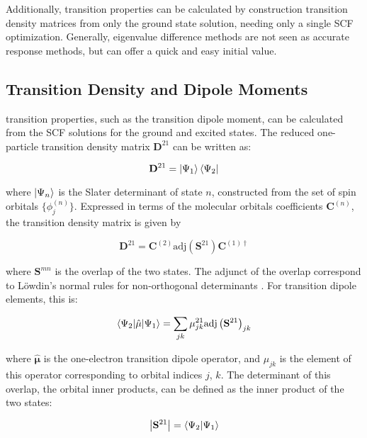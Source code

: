 Additionally, transition properties can be calculated by construction transition 
density matrices from only the ground state solution, needing only a single SCF optimization. 
Generally, eigenvalue difference methods are not seen as accurate response methods,
but can offer a quick and easy initial value\cite{Gimon2009}.

\subsection{Transition Density and Dipole Moments}
\label{subsec:dscf_transition_density}
\dscf transition properties, such as the transition dipole moment, can be calculated from
the SCF solutions for the ground and excited states. The reduced one-particle transition
density matrix $\mathbf{D}^{21}$ can be written as:

\begin{equation}
\mathbf{D}^{21} = \ket{\Psi_1} \bra{\Psi_2}
\end{equation}

where $\ket{\Psi_n}$ is the Slater determinant of state $n$, constructed from the
set of spin orbitals $\{ \phi_{j}^{\left(n\right)} \} $. Expressed 
in terms of the molecular orbitals coefficients $\mathbf{C}^{\left(n\right)}$, the
transition density matrix is given by

\begin{equation}
\mathbf{D}^{21} = \mathbf{C}^{\left(2\right)} \text{adj}\left(\mathbf{S}^{21}\right) \mathbf{C}^{\left(1\right) \dagger}
\end{equation}

where $\mathbf{S}^{mn}$ is the overlap of the two states. The adjunct of the overlap
correspond to L{\"o}wdin's normal rules for non-orthogonal determinants \cite{Lowdin1955}.
For transition dipole elements, this is:

\begin{equation}
\braket{\Psi_2|\hat{\mathbf{\mu}}|\Psi_1} = \sum_{jk} \mathbf{\mu}_{jk}^{21} \text{adj} \left( \mathbf{S}^{21}\right)_{jk}
\end{equation}

where $\hat{\mathbf{\mu}}$ is the one-electron transition dipole operator, and
$\mu_{jk}$ is the element of this operator corresponding to orbital indices $j$, $k$.
The determinant of this overlap, the orbital inner products, can be defined as the
inner product of the two states:

\begin{equation}
\left\lvert {\mathbf{S}^{21}} \right\rvert = \braket{\Psi_2|\Psi_1}
\end{equation}

